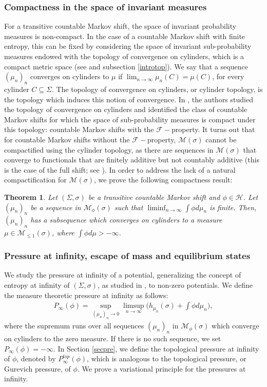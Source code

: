 \documentclass[letterpaper,11pt]{amsart}
\theoremstyle{plain}
\newtheorem{theorem}{Theorem}[section]
\theoremstyle{plain}
\theoremstyle{definition}
\theoremstyle{remark}
\def\M{{\mathcal M}}
\def\F{{\mathcal F}}
\def\H{{\mathcal H}}
\begin{document}
\subsubsection{Compactness in the space of invariant  measures}
For a transitive countable Markov shift, the space of invariant probability measures is non-compact. In the case of a countable Markov shift with finite entropy, this can be fixed by considering the space of invariant sub-probability measures endowed with the topology of convergence on cylinders, which is a compact metric space (see \cite[Theorem 1.2]{iv} and subsection \ref{introtop}). We say that a sequence $(\mu_n)_n$ converges on cylinders to $\mu$ if $\lim_{n\to\infty}\mu_n(C)=\mu(C)$, for every cylinder $C\subseteq \Sigma$. The topology of convergence on cylinders, or cylinder topology, is the topology which induces this notion of convergence. In \cite{iv}, the authors studied the topology of convergence on cylinders and identified the class of countable Markov shifts for which the space of sub-probability measures is compact under this topology: countable Markov shifts with the $\F-$property. It turns out that for countable Markov shifts without the $\F-$property, $\M(\sigma)$ cannot be compactified using the cylinder topology, as there are sequences in $\M(\sigma)$ that converge to functionals that are finitely additive but not countably additive (this is the case of the full shift; see \cite[Proposition 4.19]{iv}). In order to address the lack of a natural compactification for $\M( \sigma)$, we prove the following compactness result:

\begin{theorem}\label{thm:bsctm} Let $(\Sigma,\sigma)$ be a transitive countable Markov shift and $\phi\in\H$. Let $(\mu_n)_n$ be a sequence in $\M_\phi(\sigma)$ such that $\liminf_{n\to\infty}\int \phi d\mu_n$ is finite. Then, $(\mu_n)_n$ has a subsequence which converges on cylinders to a measure $\mu\in\M_{\le 1}(\sigma)$, where $\int \phi d\mu>-\infty$.
\end{theorem} 

\subsubsection{Pressure at infinity, escape of mass and equilibrium states}\label{sub1}
We study the pressure at infinity of a potential,  generalizing the concept of entropy at infinity of $(\Sigma,\sigma)$, as studied in \cite{r, b, itv}, to non-zero potentials. We define the measure theoretic pressure at infinity as follows:
\begin{align*}P_\infty(\phi)=\sup_{(\mu_n)_n\to 0}\limsup_{n\to\infty}\bigg(h_{\mu_n}(\sigma)+\int \phi d\mu_n\bigg),\end{align*}
where the supremum runs over all sequences $(\mu_n)_n$ in $\M_{\phi}(\sigma)$ which converge on cylinders to the zero measure. If there is no such sequence, we set $P_\infty(\phi)=-\infty$.  In Section \ref{secpre}, we define the topological pressure at infinity of $\phi$,  denoted  by $P^{top}_\infty(\phi)$, which is analogous to the topological pressure, or Gurevich pressure, of $\phi$. We prove a variational principle for the pressures at infinity.
\end{document}
